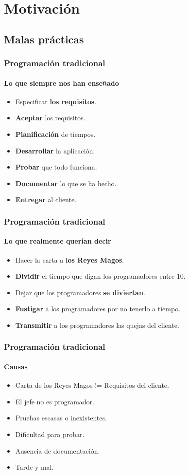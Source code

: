  \section{Motivación}

  \subsection{Malas prácticas}

  \begin{frame}
   \frametitle{Programación tradicional}
   \framesubtitle{Lo que siempre nos han enseñado}

   \begin{itemize}
    \item Especificar \textbf{los requisitos}.
    \item \textbf{Aceptar} los requisitos.
    \item \textbf{Planificación} de tiempos.
    \item \textbf{Desarrollar} la aplicación.
    \item \textbf{Probar} que todo funciona.
    \item \textbf{Documentar} lo que se ha hecho.
    \item \textbf{Entregar} al cliente.
   \end{itemize}
  \end{frame}

  \begin{frame}
   \frametitle{Programación tradicional}
   \framesubtitle{Lo que realmente querían decir}

   \begin{itemize}
    \item Hacer la carta a \textbf{los Reyes Magos}.
    \item \textbf{Dividir} el tiempo que digan los programadores entre 10.
    \item Dejar que los programadores \textbf{se diviertan}.
    \item \textbf{Fustigar} a los programadores por no tenerlo a tiempo.
    \item \textbf{Transmitir} a los programadores las quejas del cliente.
   \end{itemize}
  \end{frame}

   \begin{frame}
    \frametitle{Programación tradicional}
    \framesubtitle{Causas}
    \begin{itemize}
     \item Carta de los Reyes Magos != Requisitos del cliente.
     \item El jefe no es programador.
     \item Pruebas escasas o inexistentes.
     \item Dificultad para probar.
     \item Ausencia de documentación.
     \item Tarde y mal.
    \end{itemize}
   \end{frame}

